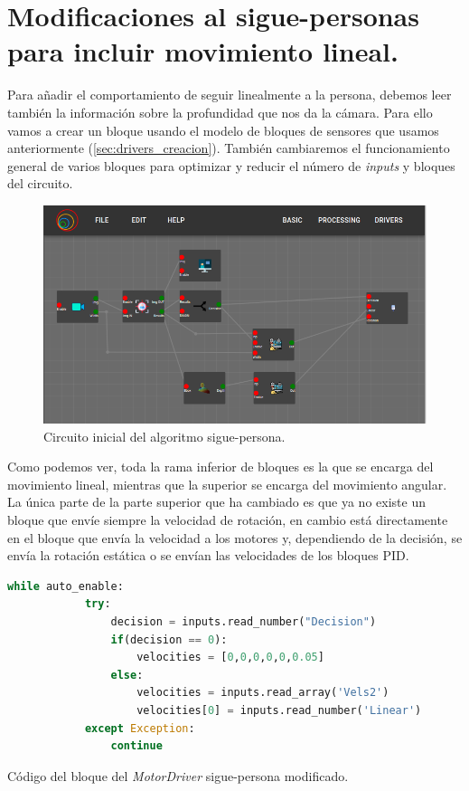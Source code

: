 \section{Modificaciones al sigue-personas para incluir movimiento lineal.}
\label{sec:FP_2}

Para añadir el comportamiento de seguir linealmente a la persona, debemos leer también la información sobre la profundidad que nos da la cámara.
Para ello vamos a crear un bloque usando el modelo de bloques de sensores que usamos anteriormente (\ref{sec:drivers_creacion}).
También cambiaremos el funcionamiento general de varios bloques para optimizar y reducir el número de \textit{inputs} y bloques del circuito.

\begin{figure} [H]
    \begin{center}
        \includegraphics[width=12cm]{figs/c5/follow_person_final_model.png}
    \end{center}
    \caption[Circuito sigue-personas inicial]{Circuito inicial del algoritmo sigue-persona.}
    \label{fig:final_follow_person}
\end{figure}

Como podemos ver, toda la rama inferior de bloques es la que se encarga del movimiento lineal, mientras que la superior se encarga del movimiento angular.
La única parte de la parte superior que ha cambiado es que ya no existe un bloque que envíe siempre la velocidad de rotación, en cambio está directamente en el
bloque que envía la velocidad a los motores y, dependiendo de la decisión, se envía la rotación estática o se envían las velocidades de los bloques PID.

\begin{code}[H]
    \begin{lstlisting}[language=python]
        while auto_enable:
            try:
                decision = inputs.read_number("Decision")
                if(decision == 0):
                    velocities = [0,0,0,0,0,0.05]
                else:
                    velocities = inputs.read_array('Vels2')
                    velocities[0] = inputs.read_number('Linear')
            except Exception:
                continue

    \end{lstlisting}
    \caption[Código bloque MotorDriver sigue-persona modificado]{Código del bloque del \textit{MotorDriver} sigue-persona modificado.}
    \label{cod:MotorDriver_FP_final}
\end{code}

